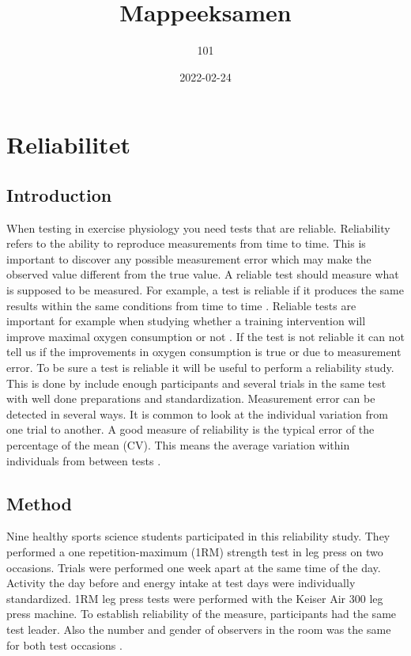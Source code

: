\documentclass[
]{book}
\title{Mappeeksamen}
\author{101}
\date{2022-02-24}
\begin{document}
\maketitle

{
\setcounter{tocdepth}{1}
\tableofcontents
}
\hypertarget{reliabilitet}{%
\chapter{Reliabilitet}\label{reliabilitet}}

\hypertarget{introduction}{%
\section{Introduction}\label{introduction}}

When testing in exercise physiology you need tests that are reliable. Reliability refers to the ability to reproduce measurements from time to time. This is important to discover any possible measurement error which may make the observed value different from the true value. A reliable test should measure what is supposed to be measured. For example, a test is reliable if it produces the same results within the same conditions from time to time \citet{hopkins2000}. Reliable tests are important for example when studying whether a training intervention will improve maximal oxygen consumption or not \citep{peng2006}. If the test is not reliable it can not tell us if the improvements in oxygen consumption is true or due to measurement error. To be sure a test is reliable it will be useful to perform a reliability study. This is done by include enough participants and several trials in the same test with well done preparations and standardization. Measurement error can be detected in several ways. It is common to look at the individual variation from one trial to another. A good measure of reliability is the typical error of the percentage of the mean (CV). This means the average variation within individuals from between tests \citep{hopkins2000}.

\hypertarget{method}{%
\section{Method}\label{method}}

Nine healthy sports science students participated in this reliability study. They performed a one repetition-maximum (1RM) strength test in leg press on two occasions. Trials were performed one week apart at the same time of the day. Activity the day before and energy intake at test days were individually standardized. 1RM leg press tests were performed with the Keiser Air 300 leg press machine. To establish reliability of the measure, participants had the same test leader. Also the number and gender of observers in the room was the same for both test occasions \citep{halperin2015}.
\end{document}
